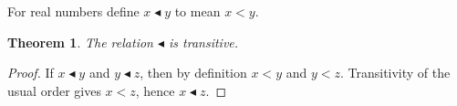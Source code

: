\documentclass{article}
\newtheorem{theorem}{Theorem}
\begin{document}
For real numbers define $x\blacktriangleleft y$ to mean $x<y$.

\begin{theorem}\label{thm:unusual-notation}
The relation $\blacktriangleleft$ is transitive.
\end{theorem}
\begin{proof}
If $x\blacktriangleleft y$ and $y\blacktriangleleft z$, then by definition
$x<y$ and $y<z$. Transitivity of the usual order gives $x<z$, hence
$x\blacktriangleleft z$.
\end{proof}
\end{document}
